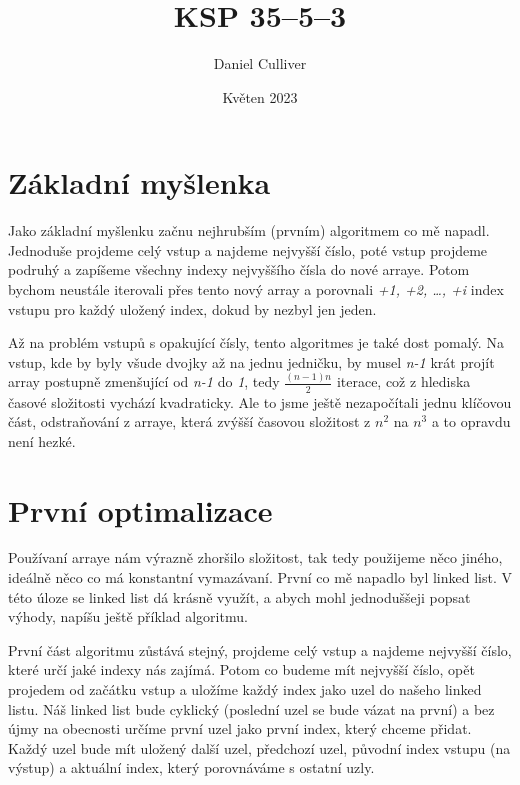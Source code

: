 \documentclass{../../../ksp}
\title{KSP 35--5--3}
\author{Daniel Culliver}
\date{Květen 2023}
\begin{document}
\maketitle

\section*{Základní myšlenka}

Jako základní myšlenku začnu nejhrubším (prvním) algoritmem co mě napadl.
Jednoduše projdeme celý vstup a najdeme nejvyšší číslo, poté vstup projdeme podruhý
a zapíšeme všechny indexy nejvyššího čísla do nové arraye. Potom bychom neustále iterovali přes tento
nový array a porovnali \emph{+1, +2, \dots, +i} index vstupu pro každý uložený index, dokud by nezbyl jen jeden.

Až na problém vstupů s opakující čísly, tento algoritmes je také dost pomalý. Na vstup, kde by byly všude dvojky
až na jednu jedničku, by musel \emph{n-1} krát projít array postupně zmenšující od \emph{n-1} do \emph{1}, tedy $\frac{(n-1)n}{2}$
iterace, což z hlediska časové složitosti vychází kvadraticky. Ale to jsme ještě nezapočítali jednu klíčovou část, odstraňování z arraye,
která zvýšší časovou složitost z $n^2$ na $n^3$ a to opravdu není hezké.

\section*{První optimalizace}

Používaní arraye nám výrazně zhoršilo složitost, tak tedy použijeme něco jiného, ideálně něco co má konstantní vymazávaní.
První co mě napadlo byl linked list. V této úloze se linked list dá krásně využít, a abych mohl jednoduššeji popsat výhody, napíšu ještě příklad algoritmu.

První část algoritmu zůstává stejný, projdeme celý vstup a najdeme nejvyšší číslo, které určí jaké indexy nás zajímá.
Potom co budeme mít nejvyšší číslo, opět projedem od začátku vstup a uložíme každý index jako uzel do našeho linked listu.
Náš linked list bude cyklický (poslední uzel se bude vázat na první) a bez újmy na obecnosti určíme první uzel jako první index, který chceme přidat.
Každý uzel bude mít uložený další uzel, předchozí uzel, původní index vstupu (na výstup) a aktuální index, který porovnáváme s ostatní uzly.
\end{document}

